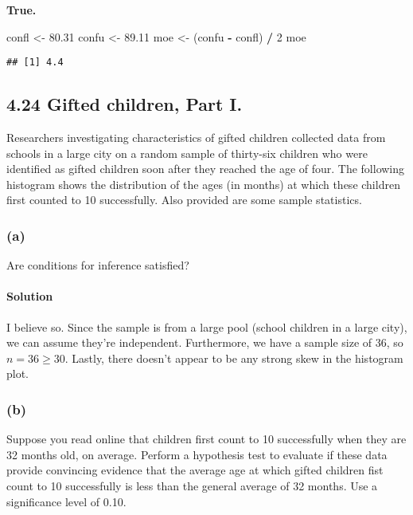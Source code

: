 \documentclass[]{article}
\newenvironment{Shaded}{\begin{snugshade}}{\end{snugshade}}
\newcommand{\DecValTok}[1]{\textcolor[rgb]{0.00,0.00,0.81}{#1}}
\newcommand{\FloatTok}[1]{\textcolor[rgb]{0.00,0.00,0.81}{#1}}
\newcommand{\StringTok}[1]{\textcolor[rgb]{0.31,0.60,0.02}{#1}}
\newcommand{\OperatorTok}[1]{\textcolor[rgb]{0.81,0.36,0.00}{\textbf{#1}}}
\newcommand{\NormalTok}[1]{#1}
\let\oldparagraph\paragraph
\renewcommand{\paragraph}[1]{\oldparagraph{#1}\mbox{}}
\begin{document}
\textbf{True.}

\begin{Shaded}
\begin{Highlighting}[]
\NormalTok{confl <-}\StringTok{ }\FloatTok{80.31}
\NormalTok{confu <-}\StringTok{ }\FloatTok{89.11}
\NormalTok{moe <-}\StringTok{ }\NormalTok{(confu }\OperatorTok{-}\StringTok{ }\NormalTok{confl) }\OperatorTok{/}\StringTok{ }\DecValTok{2}
\NormalTok{moe}
\end{Highlighting}
\end{Shaded}

\begin{verbatim}
## [1] 4.4
\end{verbatim}

\subsection{4.24 Gifted children, Part
I.}\label{gifted-children-part-i.}

Researchers investigating characteristics of gifted children collected
data from schools in a large city on a random sample of thirty-six
children who were identified as gifted children soon after they reached
the age of four. The following histogram shows the distribution of the
ages (in months) at which these children first counted to 10
successfully. Also provided are some sample statistics.

\subsubsection{(a)}\label{a-2}

Are conditions for inference satisfied?

\paragraph{Solution}\label{solution-12}

I believe so. Since the sample is from a large pool (school children in
a large city), we can assume they're independent. Furthermore, we have a
sample size of 36, so \(n = 36 \geq 30\). Lastly, there doesn't appear
to be any strong skew in the histogram plot.

\subsubsection{(b)}\label{b-2}

Suppose you read online that children first count to 10 successfully
when they are 32 months old, on average. Perform a hypothesis test to
evaluate if these data provide convincing evidence that the average age
at which gifted children fist count to 10 successfully is less than the
general average of 32 months. Use a significance level of 0.10.
\end{document}
